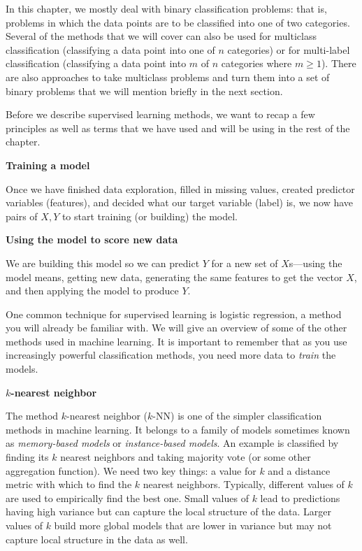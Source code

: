 \documentclass[]{krantz}
\begin{document}
In this chapter, we mostly deal with binary classification problems:
that is, problems in which the data points are to be classified into one
of two categories. Several of the methods that we will cover can also be
used for multiclass classification (classifying a data point into one of
\(n\) categories) or for multi-label classification (classifying a data
point into \(m\) of \(n\) categories where \(m\ge1\)). There are also
approaches to take multiclass problems and turn them into a set of
binary problems that we will mention briefly in the next section.

Before we describe supervised learning methods, we want to recap a few
principles as well as terms that we have used and will be using in the
rest of the chapter.

\textbf{Training a model}

Once we have finished data exploration, filled in missing values,
created predictor variables (features), and decided what our target
variable (label) is, we now have pairs of \(X,Y\) to start training (or
building) the model.

\textbf{Using the model to score new data}

We are building this model so we can predict \(Y\) for a new set of
\(X\)s---using the model means, getting new data, generating the same
features to get the vector \(X\), and then applying the model to produce
\(Y\).

One common technique for supervised learning is logistic regression, a
method you will already be familiar with. We will give an overview of
some of the other methods used in machine learning. It is important to
remember that as you use increasingly powerful classification methods,
you need more data to \emph{train} the models.

\textbf{\(k\)-nearest neighbor}

The method \(k\)-nearest neighbor (\(k\)-NN) is one of the simpler
classification methods in machine learning. It belongs to a family of
models sometimes known as \emph{memory-based models} or
\emph{instance-based models}. An example is classified by finding its
\(k\) nearest neighbors and taking majority vote (or some other
aggregation function). We need two key things: a value for \(k\) and a
distance metric with which to find the \(k\) nearest neighbors.
Typically, different values of \(k\) are used to empirically find the
best one. Small values of \(k\) lead to predictions having high variance
but can capture the local structure of the data. Larger values of \(k\)
build more global models that are lower in variance but may not capture
local structure in the data as well.
\end{document}
